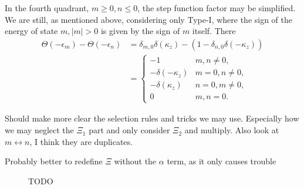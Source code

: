 In the fourth quadrant, \( m \geq 0, n \leq 0 \), the step function factor may be simplified.
We are still, as mentioned above, considering only Type-I, where the sign of the energy of state \( m, |m| > 0 \) is given by the sign of \( m \) itself.
There
\begin{equation}
  \label{eq:67}
  \begin{split}
    \Theta ( -\epsilon _m ) - \Theta (- \epsilon_n) &= \delta _{m,0} \delta (\kappa_z) - (1 - \delta_{n,0} \delta(-\kappa_z))\\
    &=
      \begin{cases}
        -1 & m,n \neq  0,\\
        - \delta (-\kappa_z) & m=0, n\neq 0,\\
        - \delta (\kappa_z) & n=0, m \neq 0,\\
        0 & m,n = 0.
      \end{cases}
  \end{split}
\end{equation}

Should make more clear the selection rules and tricks we may use.
Especially how we may neglect the \( \Xi _1 \) part and only consider \( \Xi _2 \) and multiply.
Also look at \( m \leftrightarrow n \), I think they are duplicates.

Probably better to redefine \( \Xi  \) without the \( \alpha  \) term, as it only causes trouble

\begin{figure}[h]
  \centering

  \caption{TODO}
  \label{fig:nmregion}
\end{figure}

